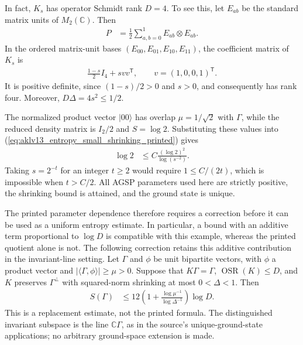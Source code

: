 \documentclass{article}
\begin{document}
In fact, $K_s$ has operator Schmidt rank $D=4$. To see this, let $E_{ab}$
be the standard matrix units of $M_2(\mathbb C)$. Then
\begin{align}
    P & =\frac12\sum_{a,b=0}^1E_{ab}\otimes E_{ab}.
    \label{eq:aklv13_entropy_small_shrinking_bell_matrix_units}
\end{align}
In the ordered matrix-unit bases $(E_{00},E_{01},E_{10},E_{11})$, the
coefficient matrix of $K_s$ is
\begin{align}
    \frac{1-s}{2}I_4+s vv^{\mathsf T},
    \qquad v=(1,0,0,1)^{\mathsf T}.
    \label{eq:aklv13_entropy_small_shrinking_coefficient_matrix}
\end{align}
It is positive definite, since $(1-s)/2>0$ and $s>0$, and consequently
has rank four. Moreover, $D\Delta=4s^2\le1/2$.

The normalized product vector $|00\rangle$ has overlap $\mu=1/\sqrt2$
with $\Gamma$, while the reduced density matrix is $I_2/2$ and
$S=\log2$. Substituting these values into
(\ref{eq:aklv13_entropy_small_shrinking_printed}) gives
\begin{align}
    \log2 & \le C\frac{(\log2)^2}{\log(s^{-2})}.
    \label{eq:aklv13_entropy_small_shrinking_entropy_substitution}
\end{align}
Taking $s=2^{-t}$ for an integer $t\ge2$ would require
$1\le C/(2t)$, which is impossible when $t>C/2$. All AGSP parameters
used here are strictly positive, the shrinking bound is attained, and the
ground state is unique.

The printed parameter dependence therefore requires a correction before
it can be used as a uniform entropy estimate. In particular, a bound
with an additive term proportional to $\log D$ is compatible with this
example, whereas the printed quotient alone is not. The following correction retains this additive contribution in the
invariant-line setting. Let $\Gamma$ and $\phi$ be unit bipartite vectors,
with $\phi$ a product vector and
$|\langle\Gamma,\phi\rangle|\ge\mu>0$. Suppose that $K\Gamma=\Gamma$,
$\operatorname{OSR}(K)\le D$, and $K$ preserves $\Gamma^\perp$ with
squared-norm shrinking at most $0<\Delta<1$. Then
\begin{align}
    S(\Gamma) & \le12\left(1+
    \frac{\log\mu^{-1}}{\log\Delta^{-1}}\right)\log D.
    \label{eq:aklv13_entropy_corrected}
\end{align}
This is a replacement estimate, not the printed formula. The distinguished
invariant subspace is the line $\mathbb C\Gamma$, as in the source's
unique-ground-state applications; no arbitrary ground-space extension is made.
\end{document}
